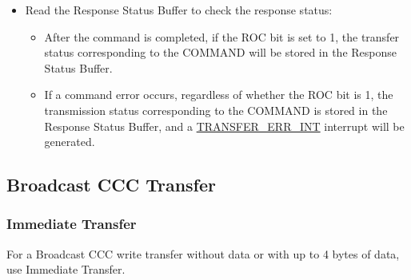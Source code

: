 \documentclass[main\_\_EN.tex]{subfiles}
\begin{document}
\begin{itemize}
    \item Read the Response Status Buffer to check the response status:
    \begin{itemize}
        \item After the command is completed, if the ROC bit is set to 1, the transfer status corresponding to the COMMAND will be stored in the Response Status Buffer.
        \item If a command error occurs, regardless of whether the ROC bit is 1, the transmission status corresponding to the COMMAND is stored in the Response Status Buffer, and a \hyperref[int:TRANSFERERRINT]{TRANSFER\_ERR\_INT} interrupt will be generated.
    \end{itemize}
\end{itemize}

\subsection{Broadcast CCC Transfer}

\subsubsection{Immediate Transfer}
For a Broadcast CCC write transfer without data or with up to 4 bytes of data, use Immediate Transfer.
\end{document}
